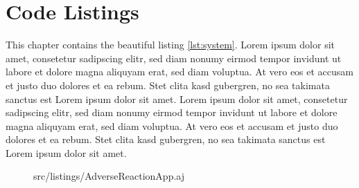 \chapter{Code Listings}\label{ch:listings}

This chapter contains the beautiful listing \ref{lst:system}. 
Lorem ipsum dolor sit amet, consetetur sadipscing elitr, sed diam nonumy 
eirmod tempor invidunt ut labore et dolore magna aliquyam erat, sed diam 
voluptua. At vero eos et accusam et justo duo dolores et ea rebum. Stet 
clita kasd gubergren, no sea takimata sanctus est Lorem ipsum dolor sit 
amet. Lorem ipsum dolor sit amet, consetetur sadipscing elitr, sed diam 
nonumy eirmod tempor invidunt ut labore et dolore magna aliquyam erat, 
sed diam voluptua. At vero eos et accusam et justo duo dolores et ea 
rebum. Stet clita kasd gubergren, no sea takimata sanctus est Lorem 
ipsum dolor sit amet. 




\begin{figure}[hbt]
\lstset{language=MontiArc}
 {src/listings/AdverseReactionApp.aj}
\end{figure}

\cleardoublepage
